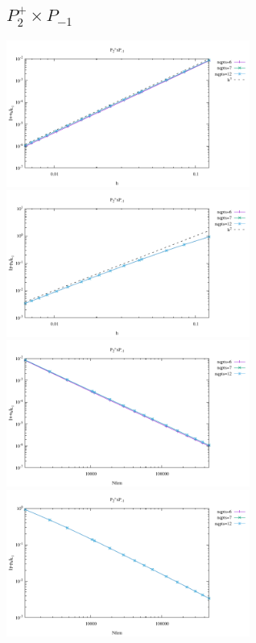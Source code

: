 \subsection*{$P_2^+\times P_{-1}$}
\begin{center}
\includegraphics[width=8cm]{python_codes/fieldstone_120/results/P2+P-1-velocity-h.pdf}
\includegraphics[width=8cm]{python_codes/fieldstone_120/results/P2+P-1-pressure-h.pdf}
\includegraphics[width=8cm]{python_codes/fieldstone_120/results/P2+P-1-velocity-Nfem.pdf}
\includegraphics[width=8cm]{python_codes/fieldstone_120/results/P2+P-1-pressure-Nfem.pdf}
\end{center}

